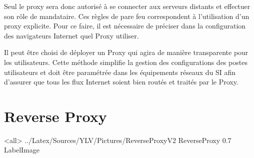 

Seul le proxy sera donc autorisé à se connecter aux serveurs distants et effectuer son rôle de mandataire.
Ces règles de pare feu correspondent à l'utilisation d'un proxy explicite. Pour ce faire, il est nécessaire de préciser dans la configuration des navigateurs Internet quel Proxy utiliser. 

Il peut être choisi de déployer un Proxy qui agira de manière transparente pour les utilisateurs. Cette méthode simplifie la gestion des configurations des postes utilisateurs et doit être paramétrée dans les équipements réseaux du SI afin d'assurer que tous les flux Internet soient bien routés et traités par le Proxy. 

\section{Reverse Proxy}

\mode<all>{\picframe
{../Latex/Sources/YLV/Pictures/ReverseProxyV2}%
{ReverseProxy} %
{0.7} %
{LabelImage} %
}

